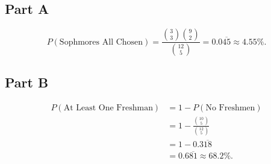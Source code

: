 \documentclass[12pt]{extarticle}
\begin{document}
\subsection*{Part A}
\[
	P(\text{Sophmores All Chosen}) = \frac{\binom{3}{3}\binom{9}{2}}{\binom{12}{5}} = 0.0\overline{45} \approx 4.55\%
.\]

\subsection*{Part B}
\begin{align*}
	P(\text{At Least One Freshman}) &= 1 - P(\text{No Freshmen}) \\
																	&= 1 - \frac{\binom{10}{5}}{\binom{12}{5}} \\
																	&= 1 - 0.3\overline{18} \\
																	&= 0.6\overline{81} \approx 68.2\%
.\end{align*}
\end{document}
